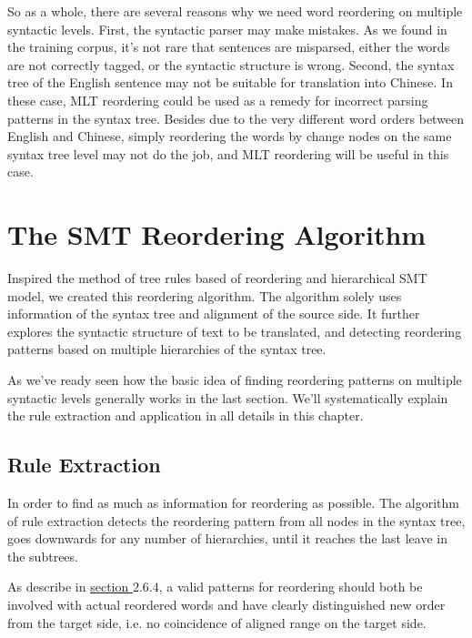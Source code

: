So as a whole, there are several reasons why we need word reordering on multiple syntactic levels. First, the syntactic parser may make mistakes. As we found in the training corpus, it's not rare that sentences are misparsed, either the words are not correctly tagged, or the syntactic structure is wrong. Second, the syntax tree of the English sentence may not be suitable for translation into Chinese. In these case, MLT reordering could be used as a remedy for incorrect parsing patterns in the syntax tree. Besides due to the very different word orders between English and Chinese, simply reordering the words by change nodes on the same syntax tree level may not do the job, and MLT reordering will be useful in this case.

\section{The SMT Reordering Algorithm}
\label{ch:ReorderingApproach:sec:Algorithm}

Inspired the method of tree rules based of reordering and hierarchical SMT model, we created this reordering algorithm. The algorithm solely uses information of the syntax tree and alignment of the source side. It further explores the syntactic structure of text to be translated, and detecting reordering patterns based on multiple hierarchies of the syntax tree.

As we've ready seen how the basic idea of finding reordering patterns on multiple syntactic levels generally works in the last section. We'll systematically explain the rule extraction and application in all details in this chapter.

\subsection{Rule Extraction}

In order to find as much as information for reordering as possible. The algorithm of rule extraction detects the reordering pattern from all nodes in the syntax tree, goes downwards for any number of hierarchies, until it reaches the last leave in the subtrees.

As describe in \hyperref[general]{section $2.6.4$}, a valid patterns for reordering should both be involved with actual reordered words and have clearly distinguished new order from the target side, i.e. no coincidence of aligned range on the target side.


